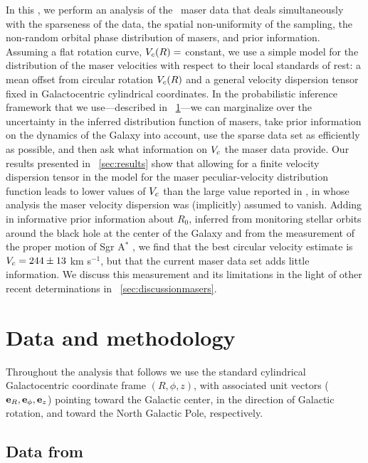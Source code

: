 In this \chaptername, we perform an analysis of the \reid\ maser data
that deals simultaneously with the sparseness of the data, the spatial
non-uniformity of the sampling, the non-random orbital phase
distribution of masers, and prior information. Assuming a flat
rotation curve, $V_c(R) = $ constant, we use a simple model for the
distribution of the maser velocities with respect to their local
standards of rest: a mean offset from circular rotation $V_c(R)$ and a
general velocity dispersion tensor fixed in Galactocentric cylindrical
coordinates. In the probabilistic inference framework that we
use---described in \sectionname~\ref{sec:data}---we can marginalize
over the uncertainty in the inferred distribution function of masers,
take prior information on the dynamics of the Galaxy into account, use
the sparse data set as efficiently as possible, and then ask what
information on $V_c$ the maser data provide. Our results presented in
\sectionname~\ref{sec:results} show that allowing for a finite
velocity dispersion tensor in the model for the maser
peculiar-velocity distribution function leads to lower values of $V_c$
than the large value reported in \reid, in whose analysis the maser
velocity dispersion was (implicitly) assumed to vanish.  Adding in
informative prior information about $R_0$, inferred from monitoring
stellar orbits around the black hole at the center of the Galaxy
\citep{Ghez08a,Gillessen09a} and from the measurement of the proper
motion of Sgr A$^*$ \citep{Reid04a}, we find that the best circular
velocity estimate is $V_c = 244 \pm 13$ km s$^{-1}$, but that the
current maser data set adds little information. We discuss this
measurement and its limitations in the light of other recent
determinations in \sectionname~\ref{sec:discussionmasers}.


\section{Data and methodology}\label{sec:data}

Throughout the analysis that follows we use the standard cylindrical
Galactocentric coordinate frame $(R,\phi,z)$, with associated unit
vectors ($\mathbf{e}_{R},\mathbf{e}_{\phi},\mathbf{e}_{z}$) pointing toward the Galactic
center, in the direction of Galactic rotation, and toward the North
Galactic Pole, respectively.

\subsection{Data from \protect\citet{Reid09a}}\label{sec:datasub}

